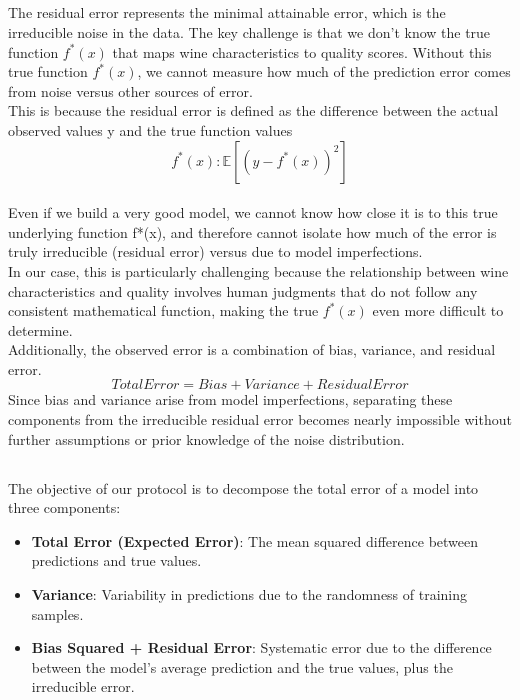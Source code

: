 \documentclass[a4paper,10pt]{article}
\begin{document}
\subsection{}

The residual error represents the minimal attainable error, which is the irreducible noise in the data. The key challenge is that we don't know the true function $f^*(x)$ that maps wine characteristics to quality scores. Without this true function $f^*(x)$, we cannot measure how much of the prediction error comes from noise versus other sources of error. \\
    
    This is because the residual error is defined as the difference between the actual observed values y and the true function values \[ f^*(x): \mathbb{E}[(y - f^*(x))^2]\]\\
    Even if we build a very good model, we cannot know how close it is to this true underlying function f*(x), and therefore cannot isolate how much of the error is truly irreducible (residual error) versus due to model imperfections. \\
    
    In our case, this is particularly challenging because the relationship between wine characteristics and quality involves human judgments that do not follow any consistent mathematical function, making the true $f^*(x)$ even more difficult to determine. \\
    
    Additionally, the observed error is a combination of bias, variance, and residual error. \[ Total Error = Bias + Variance + ResidualError\] Since bias and variance arise from model imperfections, separating these components from the irreducible residual error becomes nearly impossible without further assumptions or prior knowledge of the noise distribution.
    


\subsection{}

The objective of our protocol is to decompose the total error of a model into three components:
\begin{itemize}
    \item \textbf{Total Error (Expected Error)}: The mean squared difference between predictions and true values.
    \item \textbf{Variance}: Variability in predictions due to the randomness of training samples.
    \item \textbf{Bias Squared + Residual Error}: Systematic error due to the difference between the model's average prediction and the true values, plus the irreducible error.
\end{itemize}
\end{document}
